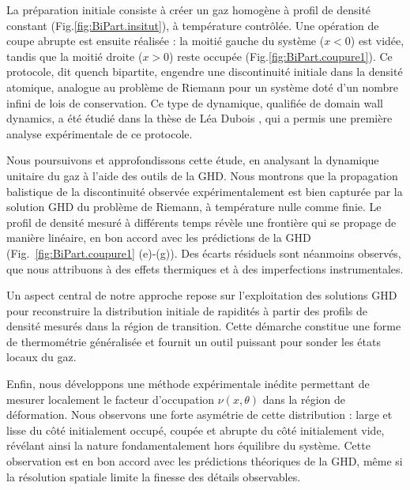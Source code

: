 La préparation initiale consiste à créer un gaz homogène à profil de densité constant (Fig.\ref{fig:BiPart.insitut}), à température contrôlée. Une opération de coupe abrupte est ensuite réalisée : la moitié gauche du système ($x<0$) est vidée, tandis que la moitié droite ($x>0$) reste occupée (Fig.\ref{fig:BiPart.coupure1}). Ce protocole, dit quench bipartite, engendre une discontinuité initiale dans la densité atomique, analogue au problème de Riemann pour un système doté d’un nombre infini de lois de conservation. Ce type de dynamique, qualifiée de domain wall dynamics, a été étudié dans la thèse de Léa Dubois \cite{DuboisThese}, qui a permis une première analyse expérimentale de ce protocole.

Nous poursuivons et approfondissons cette étude, en analysant la dynamique unitaire du gaz à l’aide des outils de la GHD. Nous montrons que la propagation balistique de la discontinuité observée expérimentalement est bien capturée par la solution GHD du problème de Riemann, à température nulle comme finie. Le profil de densité mesuré à différents temps révèle une frontière qui se propage de manière linéaire, en bon accord avec les prédictions de la GHD (Fig.~\ref{fig:BiPart.coupure1} (e)-(g)). Des écarts résiduels sont néanmoins observés, que nous attribuons à des effets thermiques et à des imperfections instrumentales.

Un aspect central de notre approche repose sur l’exploitation des solutions GHD pour reconstruire la distribution initiale de rapidités à partir des profils de densité mesurés dans la région de transition. Cette démarche constitue une forme de thermométrie généralisée et fournit un outil puissant pour sonder les états locaux du gaz.

Enfin, nous développons une méthode expérimentale inédite permettant de mesurer localement le facteur d’occupation $\nu(x, \theta)$ dans la région de déformation. Nous observons une forte asymétrie de cette distribution : large et lisse du côté initialement occupé, coupée et abrupte du côté initialement vide, révélant ainsi la nature fondamentalement hors équilibre du système. Cette observation est en bon accord avec les prédictions théoriques de la GHD, même si la résolution spatiale limite la finesse des détails observables.

